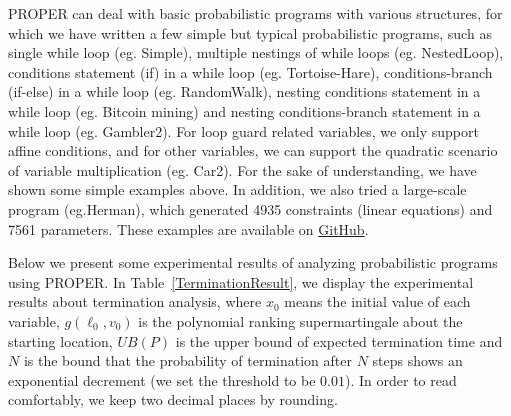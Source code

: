 \documentclass[runningheads]{llncs}
\begin{document}
PROPER can deal with basic probabilistic programs with various structures, for which we have written a few simple but typical probabilistic programs, such as single while loop (eg. Simple), multiple nestings of while loops (eg. NestedLoop), conditions statement (if) in a while loop (eg. Tortoise-Hare), conditions-branch (if-else) in a while loop (eg. RandomWalk), nesting conditions statement in a while loop (eg. Bitcoin mining) and nesting conditions-branch statement in a while loop (eg. Gambler2). For loop guard related variables, we only support affine conditions, and for other variables, we can support the quadratic scenario of variable multiplication (eg. Car2). For the sake of understanding, we have shown some simple examples above. In addition, we also tried a large-scale program (eg.Herman), which generated 4935 constraints (linear equations) and 7561 parameters. These examples are available on \href{https://github.com/Healing1219/PROPER}{GitHub}.

Below we present some experimental results of analyzing probabilistic programs using PROPER. In Table~\ref{TerminationResult}, we display the experimental results about termination analysis, where $x_0$ means the initial value of each variable, $g(\ell_0,v_0)$ is the polynomial ranking supermartingale about the starting location, $UB(P)$ is the upper bound of expected termination time and $N$ is the bound that the probability of termination after $N$ steps shows an exponential decrement (we set the threshold to  be $0.01$). In order to read comfortably, we keep two decimal places by rounding.
\end{document}
